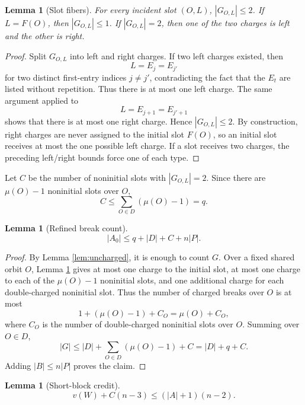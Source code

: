 \documentclass[11pt]{article}
\newtheorem{lemma}[theorem]{Lemma}
\begin{document}
\begin{lemma}[Slot fibers]\label{lem:slot}
For every incident slot \((O,L)\), \(|G_{O,L}|\le 2\).  If \(L=F(O)\), then
\(|G_{O,L}|\le 1\).  If \(|G_{O,L}|=2\), then one of the two charges is left and the other is
right.
\end{lemma}

\begin{proof}
Split \(G_{O,L}\) into left and right charges.  If two left charges existed, then
\[
  L=E_j=E_{j'}
\]
for two distinct first-entry indices \(j\ne j'\), contradicting the fact that the \(E_t\) are listed
without repetition.  Thus there is at most one left charge.  The same argument applied to
\[
  L=E_{j+1}=E_{j'+1}
\]
shows that there is at most one right charge.  Hence \(|G_{O,L}|\le 2\).  By construction, right
charges are never assigned to the initial slot \(F(O)\), so an initial slot receives at most the one
possible left charge.  If a slot receives two charges, the preceding left/right bounds force one of
each type.
\end{proof}

Let \(C\) be the number of noninitial slots with \(|G_{O,L}|=2\).  Since there are
\(\mu(O)-1\) noninitial slots over \(O\),
\[
  C\le \sum_{O\in D}(\mu(O)-1)=q. \tag{9}
\]

\begin{lemma}[Refined break count]\label{lem:fiber}
\[
  |A_0|\le q+|D|+C+n|P|. \tag{10}
\]
\end{lemma}

\begin{proof}
By Lemma \ref{lem:uncharged}, it is enough to count \(G\).  Over a fixed shared orbit \(O\), Lemma
\ref{lem:slot} gives at most one charge to the initial slot, at most one charge to each of the
\(\mu(O)-1\) noninitial slots, and one additional charge for each double-charged noninitial slot.
Thus the number of charged breaks over \(O\) is at most
\[
  1+(\mu(O)-1)+C_O=\mu(O)+C_O,
\]
where \(C_O\) is the number of double-charged noninitial slots over \(O\).  Summing over
\(O\in D\),
\[
  |G|\le |D|+\sum_{O\in D}(\mu(O)-1)+C=|D|+q+C.
\]
Adding \(|B|\le n|P|\) proves the claim.
\end{proof}

\begin{lemma}[Short-block credit]\label{lem:short}
\[
  v(W)+C(n-3)\le (|A|+1)(n-2). \tag{11}
\]
\end{lemma}
\end{document}
